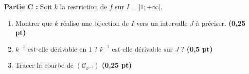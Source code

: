 \documentclass[12pt,a4paper]{article}
\begin{document}
\vspace{0.5cm}

\textbf{Partie C : } Soit $k$ la restriction de $f$ sur $I = ]1; +\infty[$.

\begin{enumerate}
    \item Montrer que $k$ réalise une bijection de $I$ vers un intervalle $J$ à préciser. \hfill \textbf{(0,25 pt)}
    \item $k^{-1}$ est-elle dérivable en 1 ? $k^{-1}$ est-elle dérivable sur $J$ ? \hfill \textbf{(0,5 pt)}
    \item Tracer la courbe de $(\mathcal{C}_{k^{-1}})$ \hfill \textbf{(0,25 pt)}
\end{enumerate}
\end{document}
